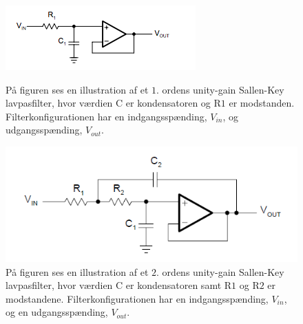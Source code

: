 \begin{figure}[H]
	\centering
	\begin{minipage}[b]{0.45\textwidth}
		\includegraphics[width=\textwidth]{figures/cProblemloesning/Lavpasfilter1_teoretisk.PNG}
		\caption{På figuren ses en illustration af et $1$. ordens unity-gain Sallen-Key lavpasfilter, hvor værdien C er kondensatoren og R$1$ er modstanden. Filterkonfigurationen har en indgangsspænding, $V_{in}$, og udgangsspænding, $V_{out}$. \cite{Carter2013}}
		\label{fig:SallenKey1}
	\end{minipage}
	\hfill
	\begin{minipage}[b]{0.45\textwidth}
		\includegraphics[width=\textwidth]{figures/cProblemloesning/Sallenlavpas.PNG}
		\caption{På figuren ses en illustration af et $2$. ordens unity-gain Sallen-Key lavpasfilter, hvor værdien C er kondensatoren samt R$1$ og R$2$ er modstandene. Filterkonfigurationen har en indgangsspænding, $V_{in}$, og en udgangsspænding, $V_{out}$. \cite{Carter2013}}
		\label{fig:SallenKey2}
	\end{minipage}
\end{figure}

